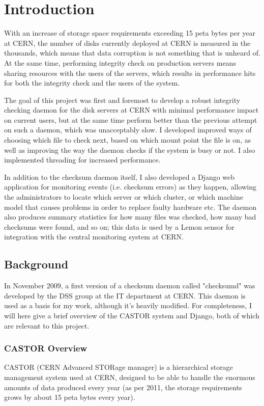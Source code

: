 \section{Introduction}
With an increase of storage space requirements exceeding 15 peta bytes per year at CERN, the number of disks currently deployed at CERN is measured in the thousands, which means that data corruption is not something that is unheard of. At the same time, performing integrity check on production servers means sharing resources with the users of the servers, which results in performance hits for both the integrity check and the users of the system. 

The goal of this project was first and foremost to develop a robust integrity checking daemon for the disk servers at CERN with minimal performance impact on current users, but at the same time perform better than the previous attempt on such a daemon, which was unacceptably slow. I developed improved ways of choosing which file to check next, based on which mount point the file is on, as well as improving the way the daemon checks if the system is busy or not. I also implemented threading for increased performance.

In addition to the checksum daemon itself, I also developed a Django web application for monitoring events (i.e. checksum errors) as they happen, allowing the administrators to locate which server or which cluster, or which machine model that causes problems in order to replace faulty hardware etc. The daemon also produces summary statistics for how many files was checked, how many bad checksums were found, and so on; this data is used by a Lemon sensor for integration with the central monitoring system at CERN.

\subsection{Background}
In November 2009, a first version of a checksum daemon called "checksumd" was developed by the DSS group at the IT department at CERN. This daemon is used as a basis for my work, although it's heavily modified. For completeness, I will here give a brief overview of the CASTOR system and Django, both of which are relevant to this project.

\subsubsection{CASTOR Overview}

CASTOR (CERN Advanced STORage manager) is a hierarchical storage management system used at CERN\cite{castor}, designed to be able to handle the enormous amounts of data produced every year (as per 2011, the storage requirements grows by about 15 peta bytes every year). 

